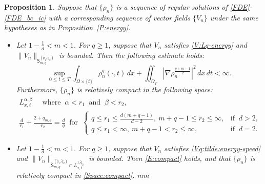 \documentclass{amsart}
\newtheorem{proposition}[defn]{Proposition}
\numberwithin{equation}{section}
\begin{document}
\begin{proposition}\label{Proposition : compactness}
	Suppose that $\{\rho_n\}$ is a sequence of regular solutions of \eqref{FDE}-\eqref{FDE_bc_ic}  with a corresponding sequence of vector fields $\{ V_n \}$ under the same hypotheses as in Proposition~\ref{P:energy}.
	\begin{itemize}
		\item [(i)] Let $1-\frac{1}{d}<m<1$. For $q\geq 1$, suppose that $V_n$ satisfies \eqref{V:Lq-energy} and $\|V_n\|_{\mathsf{S}_{m,q}^{(q_1, q_2)}}$ is bounded. Then the following estimate holds: 
		\begin{equation}\label{E:compact}
 \sup_{0\leq t \leq T}  \int_{\Omega \times \{t\}} \rho_n^q (\cdot, t) \,dx
 +  \iint_{\Omega_T} \left|\nabla \rho_n^{\frac{q+m-1}{2}}\right|^2 \,dx\,dt < \infty.
\end{equation}
Furthermore, $\{\rho_n\}$ is relatively compact in the following space:
\begin{equation}\label{Space:compact}
\begin{gathered}
L^{\alpha, \beta}_{x,t} \quad \text{ where } \ \alpha < r_1 \ \text{ and } \ \beta <r_2, \\
 \frac{d}{r_1} + \frac{2+q_{m,d}}{r_2} = \frac{d}{q}
\ \text{ for } \
\begin{cases}
  q \leq r_1 \leq \frac{d(m+q-1)}{d-2}, \ m+q-1 \leq r_2 \leq \infty, & \text{if } \ d > 2, \\
  q \leq r_1 < \infty, \ m+q-1 < r_2 \leq \infty, &\text{if }\ d = 2.
  \end{cases}
\end{gathered}
\end{equation}

\item[(ii)] Let $1-\frac{1}{d}<m<1$. For $q\geq 1$, suppose that $V_n$ satisfies \eqref{Vq:tilde:energy-speed} and $\|V_n\|_{\tilde{\mathsf{S}}_{m,q}^{(\tilde{q}_1, \tilde{q}_2)}\cap L_{x,t}^{1,\tilde{q}_2}}$ is bounded. 
Then \eqref{E:compact} holds, and that $\{\rho_n\}$ is relatively compact in \eqref{Space:compact}.
\vskip 1 mm


\end{itemize}
\end{proposition}
\end{document}

